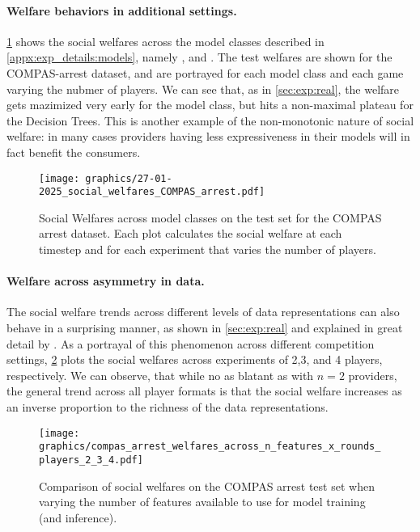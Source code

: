 \paragraph{Welfare behaviors in additional settings.}
\cref{fig:sw_across_models} shows  the social welfares across the model classes described in \cref{appx:exp_details:models}, namely , and . The test welfares are shown for the COMPAS-arrest dataset, and are portrayed for each model class and each game varying the nubmer of players.
We can see that, as in \cref{sec:exp:real}, the welfare gets mazimized very early for the  model class, but hits a non-maximal plateau for the Decision Trees. This is another example of the non-monotonic nature of social welfare: in many cases providers having less expressiveness in their models will in fact benefit the consumers.
\begin{figure}[t!]
    \centering
    \texttt{[image: graphics/27-01-2025\_social\_welfares\_COMPAS\_arrest.pdf]}
    \caption{Social Welfares across model classes on the test set for the COMPAS arrest dataset. Each plot calculates the social welfare at each timestep and for each experiment that varies the number of players.}
    \label{fig:sw_across_models}
\end{figure}
\paragraph{Welfare across asymmetry in data.}
The social welfare trends across different levels of data representations can also behave in a surprising manner, as shown in \cref{sec:exp:real} and explained in great detail by \cite{jagadeesan2024improved}. 
As a portrayal of this phenomenon across different competition settings, \cref{fig:sw_across_number_features} plots the social welfares across experiments of 2,3, and 4 players, respectively.
We can observe, that while no as blatant as with $n=2$ providers, the general trend across all player formats is that the social welfare increases as an inverse proportion to the richness of the data representations.

\begin{figure}[b!]
    \centering
    \texttt{[image: graphics/compas\_arrest\_welfares\_across\_n\_features\_x\_rounds\_players\_2\_3\_4.pdf]}
    \caption{Comparison of social welfares on the COMPAS arrest test set when varying the number of features available to use for model training (and inference). }
    \label{fig:sw_across_number_features}
\end{figure}

